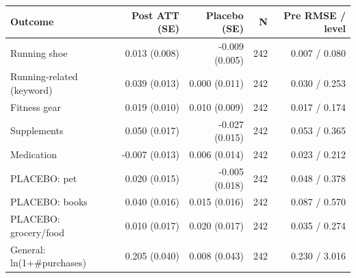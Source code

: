 \begin{tabular}{lrrrr}
\toprule
Outcome & Post ATT (SE) & Placebo (SE) & N & Pre RMSE / level \\
\midrule
Running shoe & 0.013 (0.008) & -0.009 (0.005) & 242 & 0.007 / 0.080 \\
Running-related (keyword) & 0.039 (0.013) & 0.000 (0.011) & 242 & 0.030 / 0.253 \\
Fitness gear & 0.019 (0.010) & 0.010 (0.009) & 242 & 0.017 / 0.174 \\
Supplements & 0.050 (0.017) & -0.027 (0.015) & 242 & 0.053 / 0.365 \\
Medication & -0.007 (0.013) & 0.006 (0.014) & 242 & 0.023 / 0.212 \\
PLACEBO: pet & 0.020 (0.015) & -0.005 (0.018) & 242 & 0.048 / 0.378 \\
PLACEBO: books & 0.040 (0.016) & 0.015 (0.016) & 242 & 0.087 / 0.570 \\
PLACEBO: grocery/food & 0.010 (0.017) & 0.020 (0.017) & 242 & 0.035 / 0.274 \\
General: ln(1+\#purchases) & 0.205 (0.040) & 0.008 (0.043) & 242 & 0.230 / 3.016 \\
\bottomrule
\end{tabular}
